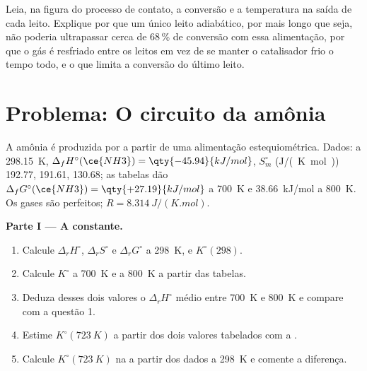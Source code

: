 \begin{exercise}[$\star\star\star$]\label{exo:b2:equilibrium-shifts:12}
Leia, na figura do processo de contato, a conversão e a temperatura na
saída de cada leito. Explique por que um único leito adiabático, por mais
longo que seja, não poderia ultrapassar cerca de 68\,\% de conversão com
essa alimentação, por que o gás é resfriado entre os leitos em vez de se
manter o catalisador frio o tempo todo, e o que limita a conversão do
último leito.
\end{exercise}

\section{Problema: O circuito da amônia}

\begin{problem}
\label{pb:b2:equilibrium-shifts:1}
A amônia é produzida por  a partir de uma
alimentação estequiométrica.
Dados: a \qty{298.15}{K}, $\Delta_f H^\circ(\ce{NH3}) = \qty{-45.94}{kJ/mol}$,
$S^\circ_m$ (\unit{J/(K.mol)})  192.77,  191.61,  130.68;
as tabelas dão $\Delta_f G^\circ(\ce{NH3}) = \qty{+27.19}{kJ/mol}$ a
\qty{700}{K} e \qty{+38.66}{kJ/mol} a \qty{800}{K}. Os gases são perfeitos;
$R = \qty{8.314}{J/(K.mol)}$.

\medskip
\noindent\textbf{Parte I --- A constante.}
\begin{enumerate}
  \item Calcule $\Delta_r H^\circ$, $\Delta_r S^\circ$ e $\Delta_r G^\circ$ a
        \qty{298}{K}, e $K^\circ(298)$.
  \item Calcule $K^\circ$ a \qty{700}{K} e a \qty{800}{K} a partir das tabelas.
  \item Deduza desses dois valores o $\Delta_r H^\circ$ médio entre
        \qty{700}{K} e \qty{800}{K} e compare com a questão 1.
  \item Estime $K^\circ(\qty{723}{K})$ a partir dos dois valores tabelados com
        a .
  \item Calcule $K^\circ(\qty{723}{K})$ na  a partir
        dos dados a \qty{298}{K} e comente a diferença.
\end{enumerate}


\end{problem}
